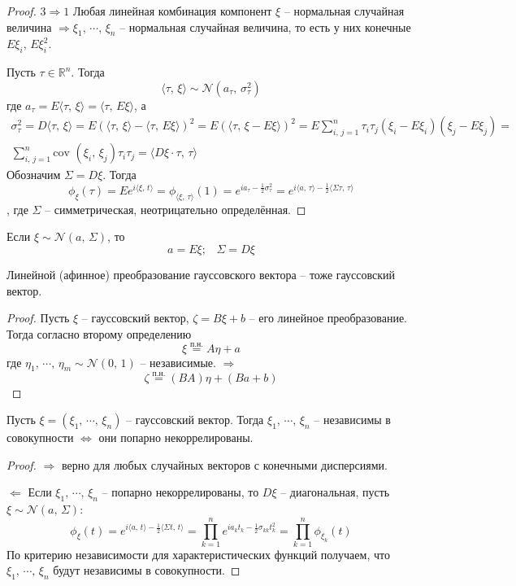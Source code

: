 \begin{proof}
	$3 \Rightarrow 1$ Любая линейная комбинация компонент $\xi$ -- нормальная случайная величина $\Rightarrow \xi_1,\,\cdots,\,\xi_n$ -- нормальная случайная величина, то есть у них конечные $E\xi_i,\, E\xi_i^2$.

	Пусть $\tau \in \mathbb{R}^n$. Тогда
	\[\langle\tau,\, \xi\rangle \sim \mathcal{N}(a_\tau,\, \sigma^2_\tau)\]
	где $a_\tau = E\langle\tau,\, \xi\rangle = \langle\tau,\, E\xi\rangle$, а
	\begin{align*}
		\sigma_\tau^2 = D\langle\tau,\, \xi\rangle = E(\langle\tau,\, \xi\rangle - \langle\tau,\, E\xi\rangle)^2 = E(\langle\tau,\, \xi - E\xi\rangle)^2 = E\sum_{i,\, j = 1}^n \tau_i\tau_j(\xi_i - E\xi_i)(\xi_j - E\xi_j) = \\
		\sum_{i,\, j = 1}^n\text{cov }(\xi_i,\,\xi_j)\tau_i\tau_j = \langle D\xi\cdot\tau,\, \tau\rangle
	\end{align*}
	Обозначим $\Sigma = D\xi$. Тогда
	\[\phi_\xi(\tau) = Ee^{i\langle\xi,\, t\rangle} = \phi_{\langle\xi,\, \tau\rangle}(1) = e^{ia_\tau - \frac{1}{2}\sigma_\tau^2} = e^{i\langle a,\,\tau\rangle - \frac{1}{2}\langle\Sigma\tau,\, \tau\rangle}\]
	, где $\Sigma$ -- симметрическая, неотрицательно определённая.
\end{proof}

\begin{corollary}
	Если $\xi \sim \mathcal{N}(a,\,\Sigma)$, то
	\[a = E\xi;\;\;\; \Sigma = D\xi\]
\end{corollary}

\begin{corollary}
	Линейной (афинное) преобразование гауссовского вектора -- тоже гауссовский вектор.
\end{corollary}

\begin{proof}
	Пусть $\xi$ -- гауссовский вектор, $\zeta = B\xi + b$ -- его линейное преобразование. Тогда согласно второму определению
	\[\xi \stackrel{\text{п.н.}}{=} A\eta + a\]
	где $\eta_1,\,\cdots,\,\eta_m \sim \mathcal{N}(0,\,1)$ -- независимые. $\Rightarrow$
	\[\zeta \stackrel{\text{п.н.}}{=} (BA)\eta + (Ba + b)\]
\end{proof}

\begin{corollary}
	Пусть $\xi = (\xi_1,\,\cdots,\,\xi_n)$ -- гауссовский вектор. Тогда $\xi_1,\,\cdots,\,\xi_n$ -- независимы в совокупности $\Leftrightarrow$ они попарно некоррелированы.
\end{corollary}

\begin{proof}
	$\Rightarrow$ верно для любых случайных векторов с конечными дисперсиями.

	$\Leftarrow$ Если $\xi_1,\,\cdots,\,\xi_n$ -- попарно некоррелированы, то $D\xi$ -- диагональная, пусть $\xi \sim \mathcal{N}(a,\, \Sigma)$:
	\[\phi_\xi(t) = e^{i\langle a,\,t\rangle - \frac{1}{2}\langle\Sigma t,\, t\rangle} = \prod_{k = 1}^n e^{ia_kt_k - \frac{1}{2}\sigma_{kk}t_k^2} = \prod_{k = 1}^n \phi_{\xi_k}(t)\]
	По критерию независимости для характеристических функций получаем, что $\xi_1,\,\cdots,\,\xi_n$ будут независимы в совокупности.
\end{proof}
